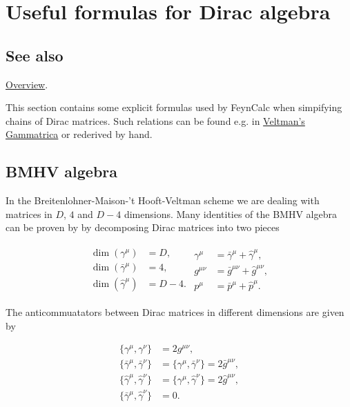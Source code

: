 \documentclass[../FeynCalcManual.tex]{subfiles}
\begin{document}
\hypertarget{useful formulas for dirac algebra}{
\section{Useful formulas for Dirac algebra}\label{useful formulas for dirac algebra}}

\subsection{See also}

\hyperlink{toc}{Overview}.

This section contains some explicit formulas used by FeynCalc when
simpifying chains of Dirac matrices. Such relations can be found e.g. in
\href{https:/XXX}{Veltman's Gammatrica} or rederived by hand.

\hypertarget{bmhv-algebra}{%
\subsection{BMHV algebra}\label{bmhv-algebra}}

In the Breitenlohner-Maison-'t Hooft-Veltman scheme we are dealing with
matrices in \(D\), \(4\) and \(D-4\) dimensions. Many identities of the
BMHV algebra can be proven by by decomposing Dirac matrices into two
pieces

\begin{align}
\begin{split}
\dim(\gamma^\mu) &= D, \\
\dim(\bar{\gamma}^\mu) &= 4, \\
\dim(\hat{\gamma}^\mu) &= D-4 .
\end{split}
\begin{split}
\gamma^\mu &= \bar{\gamma}^\mu +\hat{\gamma}^\mu, \\
g^{\mu \nu} &= \bar{g}^{\mu \nu} + \hat{g}^{\mu \nu}, \\
p^\mu & = \bar{p}^\mu + \hat{p}^\mu.
\end{split}
\end{align}

The anticommuatators between Dirac matrices in different dimensions are
given by

\begin{align}
\{ \gamma^\mu, \gamma^\nu \} &= 2 g^{\mu \nu}, \\
\{ \bar{\gamma}^\mu, \bar{\gamma}^\nu \} &= \{ \gamma^\mu, \bar{\gamma}^\nu \} = 2 \bar{g}^{\mu \nu}, \\
\{ \hat{\gamma}^\mu, \hat{\gamma}^\nu \} &= \{ \gamma^\mu, \hat{\gamma}^\nu \} = 2 \hat{g}^{\mu \nu}, \\
\{ \bar{\gamma}^\mu, \hat{\gamma}^\nu \} &= 0.
\end{align}
\end{document}
